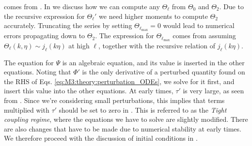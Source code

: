  comes from \cite[Eq. (49)]{callin}. In  we discuss how we can compute any $\Theta_\ell$ from $\Theta_0$ and $\Theta_2$. Due to the recursive expression for $\Theta_\ell'$ we need higher moments to compute $\Theta_2$ accurately. Truncating the series by setting $\Theta_{\ell_\mathrm{max}}=0$ would lead to numerical errors propagating down to $\Theta_2$. The expression for $\Theta_{\ell_\mathrm{max}}$ comes from assuming $\Theta_\ell(k,\eta)\sim j_\ell(k\eta)$ at high $\ell$, together with the recursive relation of $j_\ell(k\eta)$.

The equation for $\Psi$ is an algebraic equation, and its value is inserted in the other equations. Noting that $\Phi'$ is the only derivative of a perturbed quantity found on the RHS of Eqs. \eqref{eq:M3:theory:perturbation_ODEs}, we solve for it first, and insert this value into the other equations. At early times, $\tau'$ is very large, as seen from . Since we're considering small perturbations, this implies that terms multiplied with $\tau'$ should be set to zero in . This is referred to as the \textit{Tight coupling regime}, where the equations we have to solve are slightly modified. There are also changes that have to be made due to numerical stability at early times. We therefore proceed with the discussion of initial conditions in .

